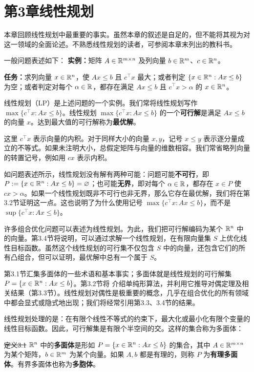 \section*{第3章\quad 线性规划}
本章回顾线性规划中最重要的事实。虽然本章的叙述是自足的，但不能将其视为对这一领域的全面论述。不熟悉线性规划的读者，可参阅本章末列出的教科书。

一般问题表述如下：
\textbf{实例：}矩阵 $A\in\mathbb R^{m\times n}$ 及列向量 $b\in\mathbb R^m$、$c\in\mathbb R^n$。\par
\textbf{任务：}求列向量 $x\in\mathbb R^n$，使 $Ax\le b$ 且 $c^\top x$ 最大；或者判定 $\{x\in\mathbb R^n:Ax\le b\}$ 为空；或者判定对每个 $\alpha\in\mathbb R$，都存在满足 $Ax\le b$ 且 $c^\top x>\alpha$ 的 $x\in\mathbb R^n$。

线性规划（LP）是上述问题的一个实例。我们常将线性规划写作 $\max\{c^\top x:Ax\le b\}$。线性规划 $\max\{c^\top x:Ax\le b\}$ 的一个\textbf{可行解}是满足 $Ax\le b$ 的向量 $x$。达到最大值的可行解称为\textbf{最优解}。

这里 $c^\top x$ 表示向量的内积。对于同样大小的向量 $x,y$，记号 $x\le y$ 表示逐分量成立的不等式。如果未注明大小，总假定矩阵与向量的维数相容。我们常省略列向量的转置记号，例如用 $cx$ 表示内积。

如问题表述所示，线性规划没有解有两种可能：问题可能\textbf{不可行}，即 $P:=\{x\in\mathbb R^n:Ax\le b\}=\varnothing$；也可能\textbf{无界}，即对每个 $\alpha\in\mathbb R$，都存在 $x\in P$ 使 $cx>\alpha$。如果一个线性规划既非不可行也非无界，那么它存在最优解，我们将在第3.2节证明这一点。这也说明了为什么使用记号 $\max\{c^\top x:Ax\le b\}$，而不是 $\sup\{c^\top x:Ax\le b\}$。

许多组合优化问题可以表述为线性规划。为此，我们把可行解编码为某个 $\mathbb R^n$ 中的向量。第3.4节将说明，可以通过求解一个线性规划，在有限向量集 $S$ 上优化线性目标函数。虽然这个线性规划的可行集不仅包含 $S$ 中的向量，还包含它们的所有凸组合，但可以证明，最优解中总有一个属于 $S$。

第3.1节汇集多面体的一些术语和基本事实；多面体就是线性规划的可行解集 $P=\{x\in\mathbb R^n:Ax\le b\}$。第3.2节将
介绍单纯形算法，并利用它推导对偶定理及相关结果（第3.3节）。线性规划对偶性是极重要的概念，几乎在组合优化的所有领域中都会显式或隐式地出现；我们将经常引用第3.3、3.4节的结果。

线性规划处理的是：在有限个线性不等式的约束下，最大化或最小化有限个变量的线性目标函数。因此，可行解集是有限个半空间的交。这样的集合称为多面体：

\st{定义3.1} $\mathbb R^n$ 中的\textbf{多面体}是形如 $P=\{x\in\mathbb R^n:Ax\le b\}$ 的集合，其中 $A\in\mathbb R^{m\times n}$ 为某个矩阵，$b\in\mathbb R^m$ 为某个向量。如果 $A,b$ 都是有理的，则称 $P$ 为\textbf{有理多面体}。有界多面体也称为\textbf{多胞体}。

